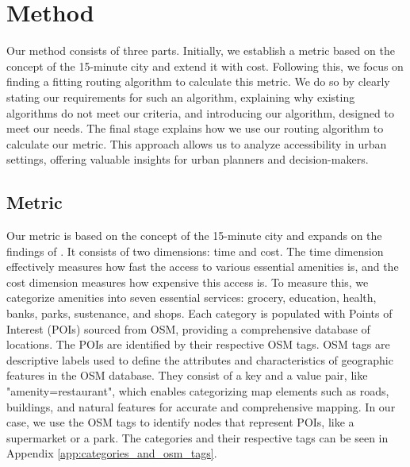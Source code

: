 \clearpage
\section{Method}
\label{sec:method}

Our method consists of three parts.
Initially, we establish a metric based on the concept of the 15-minute city and extend it with cost.
Following this, we focus on finding a fitting routing algorithm to calculate this metric.
We do so by clearly stating our requirements for such an algorithm, explaining why existing algorithms do not meet our criteria, and introducing our algorithm, designed to meet our needs. 
The final stage explains how we use our routing algorithm to calculate our metric. 
This approach allows us to analyze accessibility in urban settings, offering valuable insights for urban planners and decision-makers.

\subsection{Metric}
\label{subsec:metric}

Our metric is based on the concept of the 15-minute city and expands on the findings of .
It consists of two dimensions: time and cost.
The time dimension effectively measures how fast the access to various essential amenities is, and the cost dimension measures how expensive this access is.
To measure this, we categorize amenities into seven essential services: grocery, education, health, banks, parks, sustenance, and shops.
Each category is populated with Points of Interest (POIs) sourced from OSM, providing a comprehensive database of locations.
The POIs are identified by their respective OSM tags.
OSM tags are descriptive labels used to define the attributes and characteristics of geographic features in the OSM database. 
They consist of a key and a value pair, like "amenity=restaurant", which enables categorizing map elements such as roads, buildings, and natural features for accurate and comprehensive mapping.
In our case, we use the OSM tags to identify nodes that represent POIs, like a supermarket or a park.
The categories and their respective tags can be seen in Appendix \ref{app:categories_and_osm_tags}.

